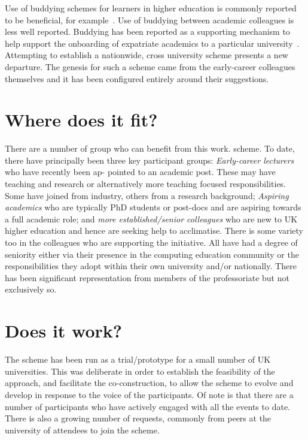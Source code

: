 \documentclass[sigconf]{acmart}
\begin{document}
Use of buddying schemes for learners in higher education is commonly
reported to be beneficial, for example~\cite{Hayes2020,May20}. Use of
buddying between academic colleagues is less well reported. Buddying
has been reported as a supporting mechanism to help support the
onboarding of expatriate academics to a particular
university~\cite{Wilkins2019}. Attempting to establish a nationwide,
cross university scheme presents a new departure. The genesis for such
a scheme came from the early-career colleagues themselves and it has
been configured entirely around their suggestions.
	
\section{Where does it fit?}

There are a number of group who can benefit from this work.
scheme. To date, there have principally been three key participant
groups: {\emph{Early-career lecturers}} who have recently been ap-
pointed to an academic post. These may have teaching and research or
alternatively more teaching focused responsibilities. Some have joined
from industry, others from a research background; {\emph{Aspiring
academics}} who are typically PhD students or post-docs and are
aspiring towards a full academic role; and {\emph{more
established/senior colleagues}} who are new to UK higher education
and hence are seeking help to acclimatise. There is some
variety too in the colleagues who are supporting the initiative. All
have had a degree of seniority either via their presence in the
computing education community or the responsibilities they adopt
within their own university and/or nationally. There has been
significant representation from members of the professoriate but not
exclusively so.

\section{Does it work?}	
\label{Sec:DoesItWork}
The scheme has been run as a trial/prototype for a small number of UK
universities. This was deliberate in order to establish the
feasibility of the approach, and facilitate the co-construction, to
allow the scheme to evolve and develop in response to the voice of the
participants. Of note is that there are a number of participants who
have actively engaged with all the events to date. There is also a
growing number of requests, commonly from peers at the university of
attendees to join the scheme.
\end{document}
